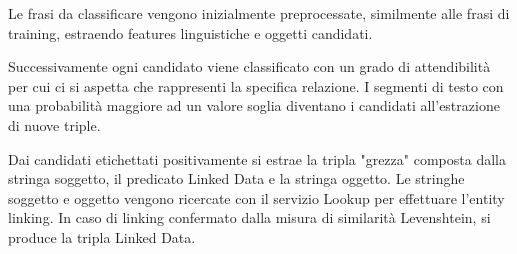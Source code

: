 Le frasi da classificare vengono inizialmente preprocessate, similmente alle frasi di training, estraendo features linguistiche e oggetti candidati.

Successivamente ogni candidato viene classificato con un grado di attendibilità per cui ci si aspetta che rappresenti la specifica relazione. I segmenti di testo con una probabilità maggiore ad un valore soglia diventano i candidati all'estrazione di nuove triple.

Dai candidati etichettati positivamente si estrae la tripla "grezza" composta dalla stringa soggetto, il predicato Linked Data e la stringa oggetto. Le stringhe soggetto e oggetto vengono ricercate con il servizio Lookup per effettuare l'entity linking. In caso di linking confermato dalla misura di similarità Levenshtein, si produce la tripla Linked Data.













